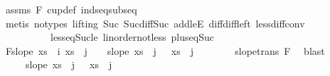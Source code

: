 \begin{isabellebody}
\ assms{\isacharparenleft}{\kern0pt}{}{\isacharparenright}{\kern0pt}\ F{}\ cup{\isacharunderscore}{\kern0pt}def\ ind{\isacharunderscore}{\kern0pt}seq{\isacharunderscore}{\kern0pt}subseq\isanewline
\ \ \ \ \ \ \isamarkupfalse%
\ {\isacharparenleft}{\kern0pt}metis\ {\isacharparenleft}{\kern0pt}no{\isacharunderscore}{\kern0pt}types{\isacharcomma}{\kern0pt}\ lifting{\isacharparenright}{\kern0pt}\ Suc{\isacharunderscore}{\kern0pt}{}\ Suc{\isacharunderscore}{\kern0pt}diff{\isacharunderscore}{\kern0pt}Suc\ add{\isacharunderscore}{\kern0pt}leE\ diff{\isacharunderscore}{\kern0pt}diff{\isacharunderscore}{\kern0pt}left\ less{\isacharunderscore}{\kern0pt}diff{\isacharunderscore}{\kern0pt}conv\isanewline
\ \ \ \ \ \ \ \ \ \ less{\isacharunderscore}{\kern0pt}eq{\isacharunderscore}{\kern0pt}Suc{\isacharunderscore}{\kern0pt}le\ linorder{\isacharunderscore}{\kern0pt}not{\isacharunderscore}{\kern0pt}less\ plus{\isacharunderscore}{\kern0pt}{}{\isacharunderscore}{\kern0pt}eq{\isacharunderscore}{\kern0pt}Suc{\isacharparenright}{\kern0pt}\isanewline
\ \ \ \ \isamarkupfalse%
\ F{}{\isacharcolon}{\kern0pt}{\isachardoublequoteopen}slope\ {\isacharparenleft}{\kern0pt}xs\ {\isacharbang}{\kern0pt}\ i{\isacharparenright}{\kern0pt}\ {\isacharparenleft}{\kern0pt}xs\ {\isacharbang}{\kern0pt}\ {\isacharparenleft}{\kern0pt}j\ {\isacharminus}{\kern0pt}\ {}{\isacharparenright}{\kern0pt}{\isacharparenright}{\kern0pt}\ {\isacharless}{\kern0pt}\ slope\ {\isacharparenleft}{\kern0pt}xs\ {\isacharbang}{\kern0pt}\ {\isacharparenleft}{\kern0pt}j\ {\isacharminus}{\kern0pt}\ {}{\isacharparenright}{\kern0pt}{\isacharparenright}{\kern0pt}\ {\isacharparenleft}{\kern0pt}xs\ {\isacharbang}{\kern0pt}\ {\isacharparenleft}{\kern0pt}j{\isacharminus}{\kern0pt}{}{\isacharparenright}{\kern0pt}{\isacharparenright}{\kern0pt}{\isachardoublequoteclose}\isanewline
\ \ \ \ \ \ \isamarkupfalse%
\ slope{\isacharunderscore}{\kern0pt}trans\ F{}\ \isamarkupfalse%
\ blast\isanewline
\ \ \ \ \isamarkupfalse%
\ \isamarkupfalse%
\ {\isachardoublequoteopen}{\isachardot}{\kern0pt}{\isachardot}{\kern0pt}{\isachardot}{\kern0pt}\ \ {\isacharless}{\kern0pt}\ \ slope\ {\isacharparenleft}{\kern0pt}xs\ {\isacharbang}{\kern0pt}\ {\isacharparenleft}{\kern0pt}j\ {\isacharminus}{\kern0pt}\ {}{\isacharparenright}{\kern0pt}{\isacharparenright}{\kern0pt}\ {\isacharparenleft}{\kern0pt}xs\ {\isacharbang}{\kern0pt}\ j{\isacharparenright}{\kern0pt}{\isachardoublequoteclose}\isanewline

\end{isabellebody}
